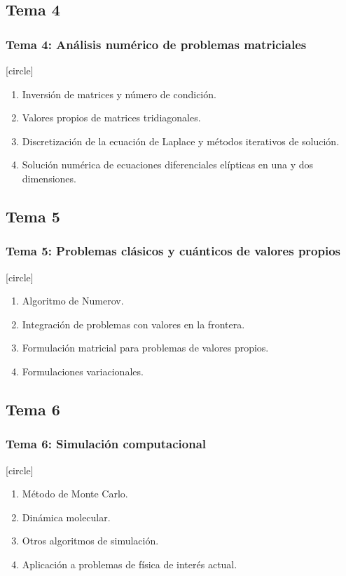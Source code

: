 \documentclass[12pt]{beamer}
\begin{document}
\subsection*{Tema 4}
\begin{frame}
\frametitle{\textbf{Tema 4: Análisis numérico de problemas matriciales}}
[circle]
\begin{enumerate}[<+->]
\item Inversión de matrices y número de condición.
\item Valores propios de matrices tridiagonales.
\item Discretización de la ecuación de Laplace y métodos iterativos de solución.
\item Solución numérica de ecuaciones diferenciales elípticas en una y dos dimensiones.
\end{enumerate}
\end{frame}
\subsection*{Tema 5}
\begin{frame}
\frametitle{\textbf{Tema 5: Problemas clásicos y cuánticos de valores propios}}
[circle]
\begin{enumerate}[<+->]
\item Algoritmo de Numerov.
\item Integración de problemas con valores en la frontera.
\item Formulación matricial para problemas de valores propios.
\item Formulaciones variacionales.
\end{enumerate}
\end{frame}
\subsection*{Tema 6}
\begin{frame}
\frametitle{\textbf{Tema 6: Simulación computacional}}
[circle]
\begin{enumerate}[<+->]
\item Método de Monte Carlo.
\item Dinámica molecular.
\item Otros algoritmos de simulación.
\item Aplicación a problemas de física de interés actual.
\end{enumerate}
\end{frame}
\end{document}
